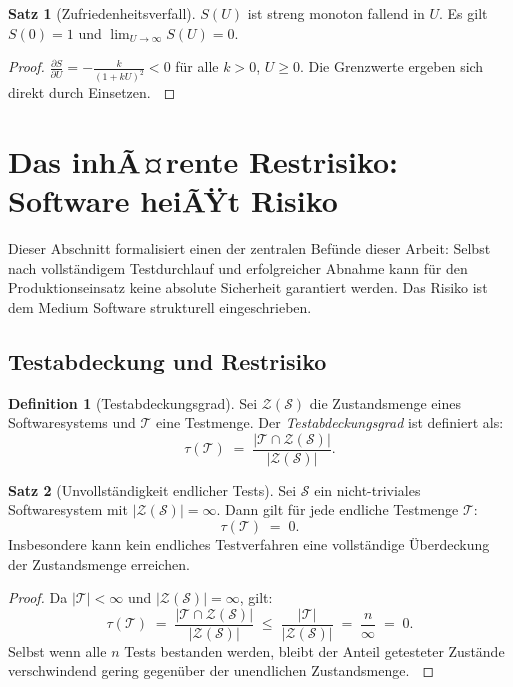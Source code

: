 ﻿\documentclass[a4paper,12pt]{article}
\theoremstyle{definition}
\newtheorem{definition}{Definition}
\newtheorem{satz}{Satz}
\newenvironment{beweis}{\begin{proof}}{\end{proof}}
\begin{document}
\begin{satz}[Zufriedenheitsverfall]
    $S(U)$ ist streng monoton fallend in $U$. Es gilt $S(0) = 1$ und
    $\lim_{U \to \infty} S(U) = 0$.
\end{satz}

\begin{beweis}
    $\frac{\partial S}{\partial U} = -\frac{k}{(1+kU)^2} < 0$ f\"ur alle $k > 0$, $U \geq 0$.
    Die Grenzwerte ergeben sich direkt durch Einsetzen. $\qedhere$
\end{beweis}

\section{Das inhÃ¤rente Restrisiko: Software heiÃŸt Risiko}

Dieser Abschnitt formalisiert einen der zentralen Bef\"unde dieser Arbeit: Selbst nach
vollst\"andigem Testdurchlauf und erfolgreicher Abnahme kann f\"ur den Produktionseinsatz
keine absolute Sicherheit garantiert werden. Das Risiko ist dem Medium Software strukturell
eingeschrieben.

\subsection{Testabdeckung und Restrisiko}

\begin{definition}[Testabdeckungsgrad]
    Sei $\mathcal{Z}(\mathcal{S})$ die Zustandsmenge eines Softwaresystems und $\mathcal{T}$
    eine Testmenge. Der \emph{Testabdeckungsgrad} ist definiert als:
    \[
        \tau(\mathcal{T}) \;=\; \frac{|\mathcal{T} \cap \mathcal{Z}(\mathcal{S})|}{|\mathcal{Z}(\mathcal{S})|}.
    \]
\end{definition}

\begin{satz}[Unvollst\"andigkeit endlicher Tests]
\label{satz:tests}
    Sei $\mathcal{S}$ ein nicht-triviales Softwaresystem mit $|\mathcal{Z}(\mathcal{S})| = \infty$.
    Dann gilt f\"ur jede endliche Testmenge $\mathcal{T}$:
    \[
        \tau(\mathcal{T}) \;=\; 0.
    \]
    Insbesondere kann kein endliches Testverfahren eine vollst\"andige \"Uberdeckung
    der Zustandsmenge erreichen.
\end{satz}

\begin{beweis}
    Da $|\mathcal{T}| < \infty$ und $|\mathcal{Z}(\mathcal{S})| = \infty$, gilt:
    \[
        \tau(\mathcal{T}) \;=\;
        \frac{|\mathcal{T} \cap \mathcal{Z}(\mathcal{S})|}{|\mathcal{Z}(\mathcal{S})|}
        \;\leq\;
        \frac{|\mathcal{T}|}{|\mathcal{Z}(\mathcal{S})|}
        \;=\; \frac{n}{\infty} \;=\; 0.
    \]
    Selbst wenn alle $n$ Tests bestanden werden, bleibt der Anteil getesteter Zust\"ande
    verschwindend gering gegen\"uber der unendlichen Zustandsmenge. $\qedhere$
\end{beweis}
\end{document}
